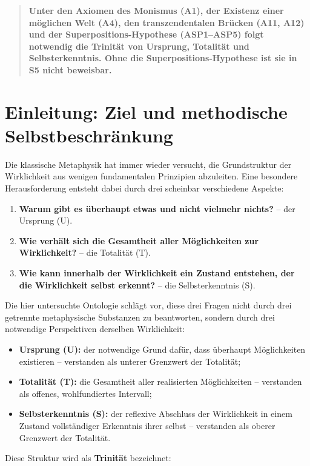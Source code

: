 \documentclass[
]{article}
\begin{document}
\begin{quote}
\textbf{Unter den Axiomen des Monismus (A1), der Existenz einer möglichen Welt (A4), den transzendentalen Brücken (A11, A12) und der Superpositions-Hypothese (ASP1–ASP5) folgt notwendig die Trinität von Ursprung, Totalität und Selbsterkenntnis. Ohne die Superpositions-Hypothese ist sie in S5 nicht beweisbar.}
\end{quote}

\section{Einleitung: Ziel und methodische Selbstbeschränkung}

Die klassische Metaphysik hat immer wieder versucht, die Grundstruktur der Wirklichkeit aus wenigen fundamentalen Prinzipien abzuleiten. Eine besondere Herausforderung entsteht dabei durch drei scheinbar verschiedene Aspekte:

\begin{enumerate}
\item \textbf{Warum gibt es überhaupt etwas und nicht vielmehr nichts?} – der Ursprung (U).
\item \textbf{Wie verhält sich die Gesamtheit aller Möglichkeiten zur Wirklichkeit?} – die Totalität (T).
\item \textbf{Wie kann innerhalb der Wirklichkeit ein Zustand entstehen, der die Wirklichkeit selbst erkennt?} – die Selbsterkenntnis (S).
\end{enumerate}

Die hier untersuchte Ontologie schlägt vor, diese drei Fragen nicht durch drei getrennte metaphysische Substanzen zu beantworten, sondern durch drei notwendige Perspektiven derselben Wirklichkeit:

\begin{itemize}
\item \textbf{Ursprung (U):} der notwendige Grund dafür, dass überhaupt Möglichkeiten existieren – verstanden als unterer Grenzwert der Totalität;
\item \textbf{Totalität (T):} die Gesamtheit aller realisierten Möglichkeiten – verstanden als offenes, wohlfundiertes Intervall;
\item \textbf{Selbsterkenntnis (S):} der reflexive Abschluss der Wirklichkeit in einem Zustand vollständiger Erkenntnis ihrer selbst – verstanden als oberer Grenzwert der Totalität.
\end{itemize}

Diese Struktur wird als \textbf{Trinität} bezeichnet:
\end{document}
